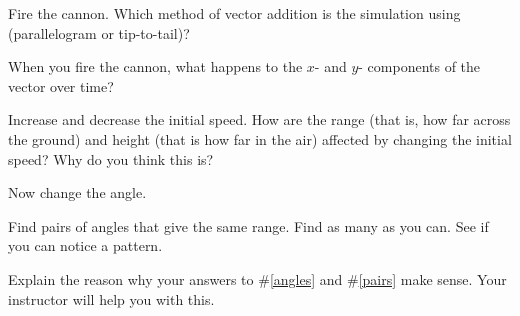\documentclass[10pt]{exam}
\begin{document}
\begin{questions}
  
\question
  Fire the cannon.  Which method of vector addition is the simulation using (parallelogram or tip-to-tail)?
  \vs

\question
  When you fire the cannon, what happens to the $x$- and $y$- components of the vector over time?
  \vs

\question
  Increase and decrease the initial speed. How are the range (that is, how far across the ground) and height (that is how far in the air) affected by changing the initial speed? Why do you think this is?
  \vs

\pagebreak

\question
  Now change the angle. \label{angles}


\question
  Find pairs of angles that give the same range.  Find as many as you can.  See if you can notice a pattern.
  \vs[3] \label{pairs}

\question
  Explain the reason why your answers to \#\ref{angles} and \#\ref{pairs} make sense.  Your instructor will help you with this.
  \vs[3]




\end{questions}
\end{document}
